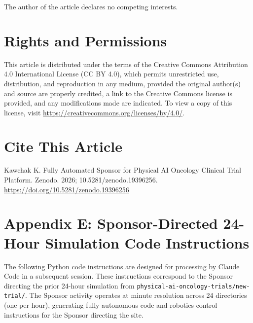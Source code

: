 The author of the article declares no competing interests.

\section*{Rights and Permissions}

This article is distributed under the terms of the Creative Commons Attribution 4.0
International License (CC BY 4.0), which permits unrestricted use, distribution, and
reproduction in any medium, provided the original author(s) and source are properly
credited, a link to the Creative Commons license is provided, and any modifications made
are indicated. To view a copy of this license, visit
\url{https://creativecommons.org/licenses/by/4.0/}.

\section*{Cite This Article}

Kawchak K. Fully Automated Sponsor for Physical AI Oncology Clinical Trial Platform.
Zenodo. 2026; 10.5281/zenodo.19396256.
\url{https://doi.org/10.5281/zenodo.19396256}

\newpage
\section*{Appendix E: Sponsor-Directed 24-Hour Simulation Code Instructions}

The following Python code instructions are designed for processing by Claude Code in a
subsequent session. These instructions correspond to the Sponsor directing the prior
24-hour simulation from \texttt{physical-ai-oncology-trials/new-trial/}. The Sponsor
activity operates at minute resolution across 24 directories (one per hour), generating
fully autonomous code and robotics control instructions for the Sponsor directing the site.

